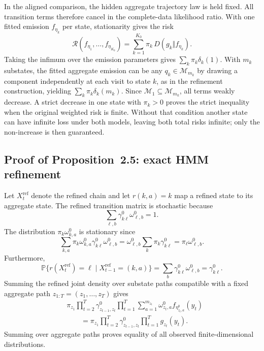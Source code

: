 \documentclass[11pt]{article}
\newcommand{\Pbb}{\mathbb{P}}
\newcommand{\Mcal}{\mathcal{M}}
\begin{document}
In the aligned comparison, the hidden aggregate trajectory law is held fixed.
All transition terms therefore cancel in the complete-data likelihood ratio.
With one fitted emission $f_{\eta_k}$ per state, stationarity gives the risk
\begin{equation*}
 \mathcal{R}(f_{\eta_1},\ldots,f_{\eta_{K_0}})=\sum_{k=1}^{K_0}\pi_k\,D(g_k\Vert f_{\eta_k}).
\end{equation*}
Taking the infimum over the emission parameters gives
$\sum_k\pi_k\delta_k(1)$. With $m_k$ substates, the fitted aggregate emission
can be any $q_k\in\Mcal_{m_k}$ by drawing a component independently
at each visit to state $k$, as in the refinement construction, yielding
$\sum_k\pi_k\delta_k(m_k)$. Since
$\Mcal_1\subseteq\Mcal_{m_k}$, all terms weakly decrease. A strict decrease in
one state with $\pi_k>0$ proves the strict inequality when the original
weighted risk is finite. Without that condition another state can have
infinite loss under both models, leaving both total risks infinite; only
the non-increase is then guaranteed.

\subsection{Proof of Proposition~2.5: exact HMM refinement}

Let $X_t^{\mathrm{ref}}$ denote the refined chain and let $r(k,a)=k$ map a
refined state to its aggregate state. The refined transition matrix is
stochastic because
\begin{equation*}
 \sum_{\ell,b}\gamma^0_{k\ell}\omega^0_{\ell,b}=1.
\end{equation*}
The distribution $\pi_k\omega^0_{k,a}$ is stationary since
\begin{equation*}
 \sum_{k,a}\pi_k\omega^0_{k,a}\gamma^0_{k\ell}\omega^0_{\ell,b}
 =\omega^0_{\ell,b}\sum_k\pi_k\gamma^0_{k\ell}
 =\pi_\ell\omega^0_{\ell,b}.
\end{equation*}
Furthermore,
\begin{equation*}
 \Pbb\{r(X_t^{\mathrm{ref}})=\ell\mid X_{t-1}^{\mathrm{ref}}=(k,a)\}
 =\sum_b\gamma^0_{k\ell}\omega^0_{\ell,b}=\gamma^0_{k\ell}.
\end{equation*}
Summing the refined joint density over substate paths compatible with a fixed
aggregate path $z_{1:T}=(z_1,\ldots,z_T)$ gives
\begin{align*}
 &\pi_{z_1}\prod_{t=2}^T\gamma^0_{z_{t-1},z_t}
 \prod_{t=1}^T\sum_{a=1}^{m_{z_t}}
 \omega^0_{z_t,a}f_{\eta^0_{z_t,a}}(y_t)\\
 &\qquad=\pi_{z_1}\prod_{t=2}^T\gamma^0_{z_{t-1},z_t}
 \prod_{t=1}^T g_{z_t}(y_t).
\end{align*}
Summing over aggregate paths proves equality of all observed
finite-dimensional distributions.
\end{document}
